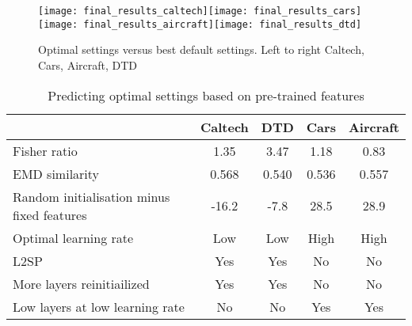 \documentclass[]{article}
\begin{document}
\begin{figure}[th]


\begin{centering}
\texttt{[image: final\_results\_caltech]}\texttt{[image: final\_results\_cars]}\texttt{[image: final\_results\_aircraft]}\texttt{[image: final\_results\_dtd]}
\caption{Optimal settings versus best default settings. Left to right Caltech, Cars, Aircraft, DTD}
\label{final figure}
\par\end{centering}
\end{figure}

\begin{table}[th]

\caption{Predicting optimal settings based on pre-trained features}
\label{predicting}
\centering
\begin{tabular}{p{3.2cm}cccc}
\hline 
 & Caltech & DTD & Cars & Aircraft\tabularnewline
\hline 
Fisher ratio & 1.35 & 3.47 & 1.18 & 0.83\tabularnewline
EMD similarity & 0.568 & 0.540 & 0.536 & 0.557\tabularnewline
Random initialisation minus fixed features & -16.2 & -7.8 & 28.5 & 28.9\tabularnewline
Optimal learning rate & Low & Low & High & High\tabularnewline
L2SP & Yes & Yes & No & No\tabularnewline
More layers reinitiailized & Yes & Yes & No & No\tabularnewline
Low layers at low learning rate & No & No & Yes & Yes\tabularnewline
\hline 
\end{tabular}

\end{table}
\end{document}
